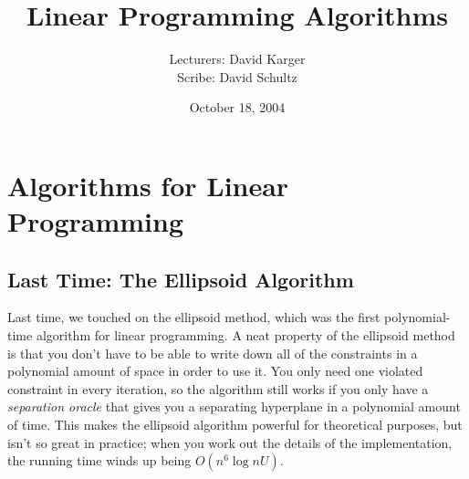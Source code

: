 \documentclass{article}
\title{Linear Programming Algorithms}
\date{October 18, 2004}
\author{Lecturers: David Karger\\ Scribe: David Schultz}
\begin{document}
%
%
%
%

%




\section{Algorithms for Linear Programming}

\subsection{Last Time: The Ellipsoid Algorithm}

Last time, we touched on the ellipsoid method, which was the first
polynomial-time algorithm for linear programming.  A neat property of
the ellipsoid method is that you don't have to be able to write down
all of the constraints in a polynomial amount of space in order to use
it.  You only need one violated constraint in every iteration, so the
algorithm still works if you only have a \textit{separation oracle}
that gives you a separating hyperplane in a polynomial amount of time.
This makes the ellipsoid algorithm powerful for theoretical purposes,
but isn't so great in practice; when you work out the details of the
implementation, the running time winds up being $O(n^6\log nU)$.
\end{document}
